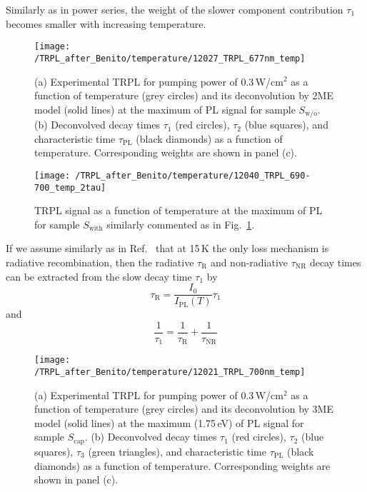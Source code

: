 Similarly as in power series, the weight of the slower component contribution $\tau_1$ becomes smaller with increasing temperature.
%
\begin{figure}
	\centering
	\texttt{[image: /TRPL\_after\_Benito/temperature/12027\_TRPL\_677nm\_temp]}
	\caption{(a) Experimental TRPL for pumping power of 0.3$\,$W/cm$^2$ as a function of temperature (grey circles) and its deconvolution by 2ME model (solid lines) at the maximum of PL signal for sample $S_\mathrm{w/o}$. (b) Deconvolved decay times $\tau_1$ (red circles), $\tau_2$ (blue squares), and characteristic time $\tau_\mathrm{PL}$ (black diamonds) as a function of temperature. Corresponding weights are shown in panel (c).}
	\label{fig:TRPL_temp_wo}
\end{figure}
%
\begin{figure}
	\centering
	\texttt{[image: /TRPL\_after\_Benito/temperature/12040\_TRPL\_690-700\_temp\_2tau]}
	\caption{TRPL signal as a function of temperature at the maximum of PL for sample $S_\mathrm{with}$ similarly commented as in Fig.~\ref{fig:TRPL_temp_wo}.}
	\label{fig:TRPL_temp_w}
\end{figure}
%

If we assume similarly as in Ref.~\citep{t_alvarez} that at 15$\,$K the only loss mechanism is radiative recombination, then the radiative $\tau_\mathrm{R}$ and non-radiative $\tau_\mathrm{NR}$ decay times can be extracted from the slow decay time $\tau_1$ by
%
\begin{equation}
\tau_\mathrm{R}=\frac{I_0}{I_\mathrm{PL}(T)}\tau_1 \label{eq:tau_R_fromtau1}
\end{equation}
and
\begin{equation}
\frac{1}{\tau_1}=\frac{1}{\tau_\mathrm{R}} + \frac{1}{\tau_\mathrm{NR}}
\end{equation}
%
\begin{figure}
	\centering
	\texttt{[image: /TRPL\_after\_Benito/temperature/12021\_TRPL\_700nm\_temp]}
	\caption{(a) Experimental TRPL for pumping power of 0.3$\,$W/cm$^2$ as a function of temperature (grey circles) and its deconvolution by 3ME model (solid lines) at the maximum (1.75$\,$eV) of PL signal for sample $S_\mathrm{cap}$. (b) Deconvolved decay times $\tau_1$ (red circles), $\tau_2$ (blue squares),  $\tau_3$ (green triangles), and characteristic time $\tau_\mathrm{PL}$ (black diamonds) as a function of temperature. Corresponding weights are shown in panel (c).}
	\label{fig:TRPL_temp_c}
\end{figure}
%

